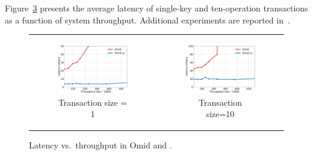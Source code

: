 Figure~\ref{fig:throughput-latency} presents the average latency of single-key and ten-operation transactions as a function of {system} throughput.
Additional experiments are reported in~\cite{OmidVLDB}.  


\begin{figure}[htb]

\centering
\begin{tabular}{cc}

    \begin{subfigure}[t]{0.3\textwidth}
      	\includegraphics[width=\textwidth]{figs/throughputlatency1.pdf}
	    \caption[]{\small Transaction size = 1}
        \label{fig:tl-1}      
   \end{subfigure}  
& 
    \begin{subfigure}[t]{0.3\textwidth}
	\includegraphics[width=\textwidth]{figs/throughputlatency10.pdf}
	\caption[]{\small Transaction size=10}
    \label{fig:tl-10}
  \end{subfigure}  
 \end{tabular} 
 
  \caption{\small Latency vs.\ throughput  in Omid and \sysll.}
  \vspace{-0.3cm}
  \label{fig:throughput-latency}
\end{figure}



